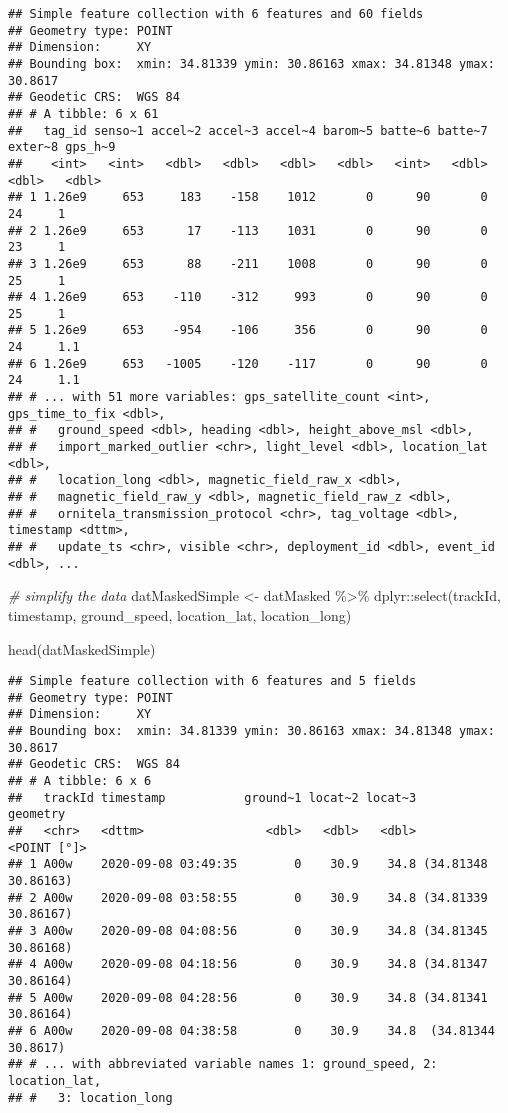 \documentclass[
]{article}
\newenvironment{Shaded}{\begin{snugshade}}{\end{snugshade}}
\newcommand{\CommentTok}[1]{\textcolor[rgb]{0.56,0.35,0.01}{\textit{#1}}}
\newcommand{\FunctionTok}[1]{\textcolor[rgb]{0.00,0.00,0.00}{#1}}
\newcommand{\NormalTok}[1]{#1}
\newcommand{\OtherTok}[1]{\textcolor[rgb]{0.56,0.35,0.01}{#1}}
\newcommand{\SpecialCharTok}[1]{\textcolor[rgb]{0.00,0.00,0.00}{#1}}
\begin{document}
\begin{verbatim}
## Simple feature collection with 6 features and 60 fields
## Geometry type: POINT
## Dimension:     XY
## Bounding box:  xmin: 34.81339 ymin: 30.86163 xmax: 34.81348 ymax: 30.8617
## Geodetic CRS:  WGS 84
## # A tibble: 6 x 61
##   tag_id senso~1 accel~2 accel~3 accel~4 barom~5 batte~6 batte~7 exter~8 gps_h~9
##    <int>   <int>   <dbl>   <dbl>   <dbl>   <dbl>   <int>   <dbl>   <dbl>   <dbl>
## 1 1.26e9     653     183    -158    1012       0      90       0      24     1  
## 2 1.26e9     653      17    -113    1031       0      90       0      23     1  
## 3 1.26e9     653      88    -211    1008       0      90       0      25     1  
## 4 1.26e9     653    -110    -312     993       0      90       0      25     1  
## 5 1.26e9     653    -954    -106     356       0      90       0      24     1.1
## 6 1.26e9     653   -1005    -120    -117       0      90       0      24     1.1
## # ... with 51 more variables: gps_satellite_count <int>, gps_time_to_fix <dbl>,
## #   ground_speed <dbl>, heading <dbl>, height_above_msl <dbl>,
## #   import_marked_outlier <chr>, light_level <dbl>, location_lat <dbl>,
## #   location_long <dbl>, magnetic_field_raw_x <dbl>,
## #   magnetic_field_raw_y <dbl>, magnetic_field_raw_z <dbl>,
## #   ornitela_transmission_protocol <chr>, tag_voltage <dbl>, timestamp <dttm>,
## #   update_ts <chr>, visible <chr>, deployment_id <dbl>, event_id <dbl>, ...
\end{verbatim}

\begin{Shaded}
\begin{Highlighting}[]
\CommentTok{\# simplify the data}
\NormalTok{datMaskedSimple }\OtherTok{\textless{}{-}}\NormalTok{ datMasked }\SpecialCharTok{\%\textgreater{}\%}
\NormalTok{  dplyr}\SpecialCharTok{::}\FunctionTok{select}\NormalTok{(trackId, timestamp, ground\_speed, location\_lat, location\_long)}

\FunctionTok{head}\NormalTok{(datMaskedSimple)}
\end{Highlighting}
\end{Shaded}

\begin{verbatim}
## Simple feature collection with 6 features and 5 fields
## Geometry type: POINT
## Dimension:     XY
## Bounding box:  xmin: 34.81339 ymin: 30.86163 xmax: 34.81348 ymax: 30.8617
## Geodetic CRS:  WGS 84
## # A tibble: 6 x 6
##   trackId timestamp           ground~1 locat~2 locat~3            geometry
##   <chr>   <dttm>                 <dbl>   <dbl>   <dbl>         <POINT [°]>
## 1 A00w    2020-09-08 03:49:35        0    30.9    34.8 (34.81348 30.86163)
## 2 A00w    2020-09-08 03:58:55        0    30.9    34.8 (34.81339 30.86167)
## 3 A00w    2020-09-08 04:08:56        0    30.9    34.8 (34.81345 30.86168)
## 4 A00w    2020-09-08 04:18:56        0    30.9    34.8 (34.81347 30.86164)
## 5 A00w    2020-09-08 04:28:56        0    30.9    34.8 (34.81341 30.86164)
## 6 A00w    2020-09-08 04:38:58        0    30.9    34.8  (34.81344 30.8617)
## # ... with abbreviated variable names 1: ground_speed, 2: location_lat,
## #   3: location_long
\end{verbatim}
\end{document}
